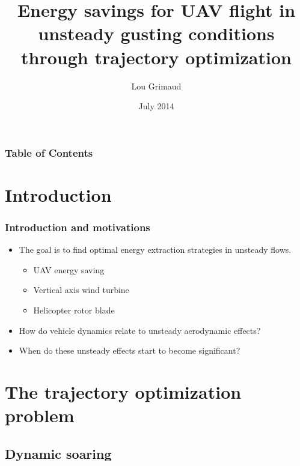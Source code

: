 \documentclass[compress]{beamer}
\title[Trajectory optimization]{Energy savings for UAV flight in unsteady gusting conditions \\
through trajectory optimization }
\author{Lou Grimaud} %
\institute{Illinois Institute of Technology} %
\date{July 2014} %
\begin{document}


\frame{\titlepage}

\begin{frame}
  \frametitle{Table of Contents}
  \tableofcontents
\end{frame}

\section{Introduction}
\begin{frame}
  \frametitle{Introduction and motivations}
  \begin{itemize}
    \item The goal is to find optimal energy extraction strategies in unsteady flows.
  \begin{itemize}
  \item[\MVRightarrow] UAV energy saving
    \item[\MVRightarrow] Vertical axis wind turbine
    \item[\MVRightarrow] Helicopter rotor blade
  \end{itemize}

\item How do vehicle dynamics relate to unsteady aerodynamic effects?

\item When do these unsteady effects start to become significant?
  \end{itemize}

\end{frame}

\section[Trajectory optimization]{The trajectory optimization problem}

\subsection{Dynamic soaring}
\end{document}
